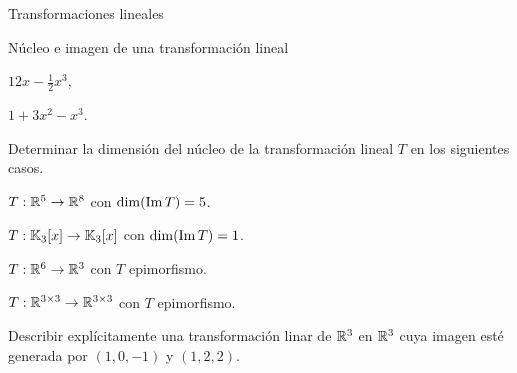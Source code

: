 \begin{chapter}{Transformaciones lineales}
\begin{section}{N\'ucleo e imagen de una transformaci\'on lineal}
\begin{enumex}
\begin{enumex}
                    \begin{minipage}{0.3\textwidth}
                        \item $12x-\frac12 x^3$,
                    \end{minipage}
                    \begin{minipage}{0.4\textwidth}
                        \item $1 +3x^2 -x^3$.
                    \end{minipage}
                \end{enumex}
            \item Determinar la dimensión del núcleo de la transformación lineal $T$ en los siguientes casos. 
                \begin{enumex}
                    \item $T: \mathbb R^5 \to \mathbb R^8$ con $\dim(\operatorname{Im} T) =5$.
                    \item  $T: \mathbb K_3[x]\to \mathbb K_3[x]$ con $\dim(\operatorname{Im} T) =1$.
                    \item  $T: \mathbb R^6 \to \mathbb R^3$ con $T$ epimorfismo.
                    \item $T: \mathbb R^{3 \times 3} \to \mathbb R^{3 \times 3}$ con $T$ epimorfismo.
                \end{enumex}

            \item Describir explícitamente una transformación linar de $\mathbb R^3$ en $\mathbb R^3$ cuya imagen esté generada por $(1,0,-1)$ y $(1,2,2)$. 


\end{enumex}
\end{section}
\end{chapter}
